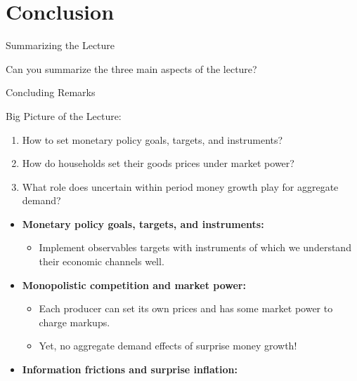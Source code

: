 \documentclass[10pt,c,aspectratio=1610,handout]{beamer}
\begin{document}
\section{Conclusion}%
\begin{frame}{Summarizing the Lecture}%
  \begin{center}%
    \begin{large}%
      Can you summarize the three main aspects of the lecture?%
    \end{large}%
  \end{center}%
\end{frame}%
\begin{frame}{Concluding Remarks}%
  \begin{block}{Big Picture of the Lecture:}%
    \begin{enumerate}%
      \item How to set monetary policy goals, targets, and instruments?%
      \item How do households set their goods prices under market power?%
      \item What role does uncertain within period money growth play for aggregate demand?%
    \end{enumerate}%
  \end{block}%
  \pause%
  \begin{itemize}%
    \item[$\blacktriangleright$] \textbf{Monetary policy goals, targets, and instruments:}%
    \begin{itemize}%
      \item[$\rightarrow$] Implement observables targets with instruments of which we understand their economic channels well.%
    \end{itemize}%
    \item[$\blacktriangleright$] \textbf{Monopolistic competition and market power:}%
    \begin{itemize}%
      \item[$\rightarrow$] Each producer can set its own prices and has some market power to charge markups.%
      \item[$\rightarrow$] Yet, no aggregate demand effects of surprise money growth!%
    \end{itemize}%
    \pause%
    \item[$\blacktriangleright$] \textbf{Information frictions and surprise inflation:}%

\end{itemize}
\end{frame}
\end{document}
